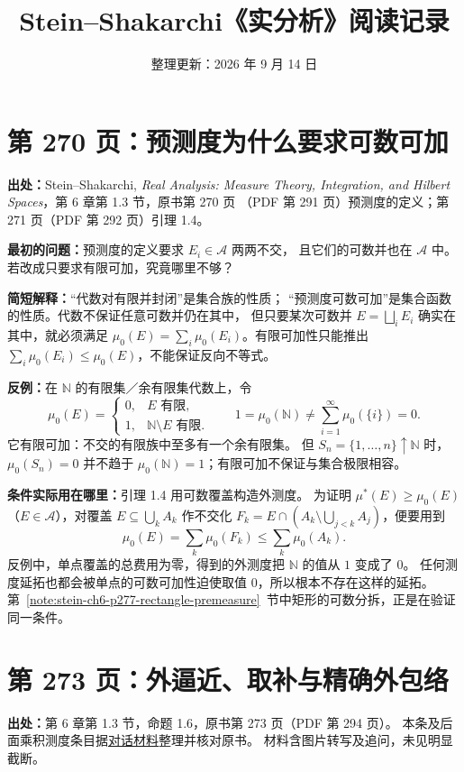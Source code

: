 \documentclass[UTF8,a4paper,11pt]{ctexart}
\title{Stein--Shakarchi《实分析》阅读记录}
\author{}
\date{整理更新：2026 年 9 月 14 日}
\begin{document}
\maketitle
\vspace{-2em}
\section{第 270 页：预测度为什么要求可数可加}
\label{note:stein-ch6-p270-premeasure-additivity}
\textbf{出处：}Stein--Shakarchi, \textit{Real Analysis: Measure Theory,
Integration, and Hilbert Spaces}，第 6 章第 1.3 节，原书第 270 页
（PDF 第 291 页）预测度的定义；第 271 页（PDF 第 292 页）引理 1.4。

\textbf{最初的问题：}预测度的定义要求 $E_i\in\mathcal A$ 两两不交，
且它们的可数并也在 $\mathcal A$ 中。若改成只要求有限可加，究竟哪里不够？

\textbf{简短解释：}“代数对有限并封闭”是集合族的性质；
“预测度可数可加”是集合函数的性质。代数不保证任意可数并仍在其中，
但只要某次可数并 $E=\bigsqcup_iE_i$ 确实在其中，就必须满足
$\mu_0(E)=\sum_i\mu_0(E_i)$。有限可加性只能推出
$\sum_i\mu_0(E_i)\leq\mu_0(E)$，不能保证反向不等式。

\textbf{反例：}在 $\mathbb N$ 的有限集／余有限集代数上，令
\[
\mu_0(E)=
\begin{cases}
0,&E\text{ 有限},\\
1,&\mathbb N\setminus E\text{ 有限}.
\end{cases}
\qquad
1=\mu_0(\mathbb N)\ne\sum_{i=1}^{\infty}\mu_0(\{i\})=0.
\]
它有限可加：不交的有限族中至多有一个余有限集。
但 $S_n=\{1,\ldots,n\}\uparrow\mathbb N$ 时，
$\mu_0(S_n)=0$ 并不趋于 $\mu_0(\mathbb N)=1$；有限可加不保证与集合极限相容。

\textbf{条件实际用在哪里：}引理 1.4 用可数覆盖构造外测度。
为证明 $\mu^*(E)\geq\mu_0(E)$（$E\in\mathcal A$），对覆盖
$E\subseteq\bigcup_k A_k$ 作不交化
$F_k=E\cap(A_k\setminus\bigcup_{j<k}A_j)$，便要用到
\[
\mu_0(E)=\sum_k\mu_0(F_k)\leq\sum_k\mu_0(A_k).
\]
反例中，单点覆盖的总费用为零，得到的外测度把 $\mathbb N$ 的值从 $1$ 变成了 $0$。
任何测度延拓也都会被单点的可数可加性迫使取值 $0$，所以根本不存在这样的延拓。
第~\ref{note:stein-ch6-p277-rectangle-premeasure}~节中矩形的可数分拆，正是在验证同一条件。

\newpage
\section{第 273 页：外逼近、取补与精确外包络}
\label{note:stein-ch6-p273-outer-approximation}
\textbf{出处：}第 6 章第 1.3 节，命题 1.6，原书第 273 页（PDF 第 294 页）。
本条及后面乘积测度条目据\href{\%E8\%B5\%84\%E6\%96\%99/product_measure_conversation_transcript.md}{对话材料}整理并核对原书。
材料含图片转写及追问，未见明显截断。
\end{document}
